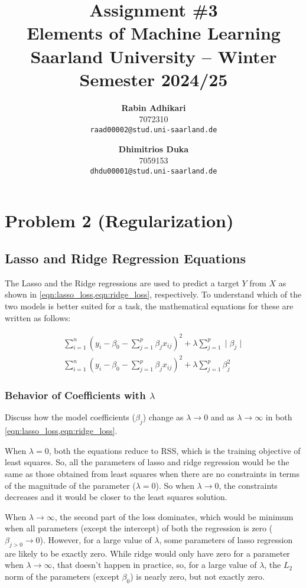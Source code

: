\documentclass{article}
\title{Assignment \#3\\
  \vspace{2mm}
  \small{Elements of Machine Learning}
  \\
  \vspace{2mm}
  \small{Saarland University -- Winter Semester 2024/25}
}
\author{%
\textbf{Rabin Adhikari} \\
  7072310 \\
  \texttt{raad00002@stud.uni-saarland.de} \\
  \and
  \textbf{Dhimitrios Duka} \\
 7059153 \\
  \texttt{dhdu00001@stud.uni-saarland.de} \\
}
\begin{document}
\maketitle

\setcounter{section}{1}
\section{Problem 2 (Regularization)}

\subsection{Lasso and Ridge Regression Equations}
The Lasso and the Ridge regressions are used to predict a target $Y$ from $X$ as shown in \cref{eqn:lasso_loss,eqn:ridge_loss}, respectively.
To understand which of the two models is better suited for a task, the mathematical equations for these are written as follows:

\begin{gather}
    \label{eqn:lasso_loss}
    \sum_{i=1}^{n} \left( y_i - \beta_0 - \sum_{j=1}^{p} \beta_j x_{ij} \right)^2 + \lambda \sum_{j=1}^{p} \mid \beta_j \mid \\
    \label{eqn:ridge_loss}
    \sum_{i=1}^{n} \left( y_i - \beta_0 - \sum_{j=1}^{p} \beta_j x_{ij} \right)^2 + \lambda \sum_{j=1}^{p} \beta_j^2
\end{gather}

\subsubsection{Behavior of Coefficients with $\lambda$}
\question
Discuss how the model coefficients ($\beta_j$) change as $\lambda \to 0$ and as $\lambda \to \infty$ in both \cref{eqn:lasso_loss,eqn:ridge_loss}.

\answer
When $\lambda = 0$, both the equations reduce to RSS, which is the training objective of least squares.
So, all the parameters of lasso and ridge regression would be the same as those obtained from least squares when there are no constraints in terms of the magnitude of the parameter ($\lambda = 0$).
So when $\lambda \to 0$, the constraints decreases and it would be closer to the least squares solution.

When $\lambda \to \infty$, the second part of the loss dominates, which would be minimum when all parameters (except the intercept) of both the regression is zero ($\beta_{j>0} \to 0$).
However, for a large value of $\lambda$, some parameters of lasso regression are likely to be exactly zero.
While ridge would only have zero for a parameter when $\lambda \to \infty$, that doesn't happen in practice, so, for a large value of $\lambda$, the $L_2$ norm of the parameters (except $\beta_0$) is nearly zero, but not exactly zero.
\end{document}
